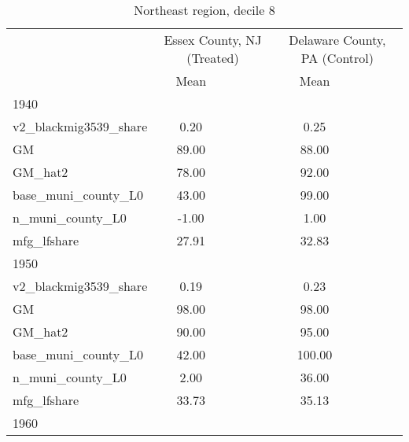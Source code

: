 \begin{table}[htbp]\centering
\def\sym#1{\ifmmode^{#1}\else\(^{#1}\)\fi}
\caption{Northeast region, decile 8 \label{tab1}}
\begin{tabular}{l*{2}{ccc}}
\toprule
                    &\multicolumn{3}{c}{Essex County, NJ (Treated)}&\multicolumn{3}{c}{Delaware County, PA (Control)}\\
                    &        Mean&            &            &        Mean&            &            \\
\midrule
1940                &            &            &            &            &            &            \\
v2\_blackmig3539\_share&        0.20&            &            &        0.25&            &            \\
GM                  &       89.00&            &            &       88.00&            &            \\
GM\_hat2             &       78.00&            &            &       92.00&            &            \\
base\_muni\_county\_L0 &       43.00&            &            &       99.00&            &            \\
n\_muni\_county\_L0    &       -1.00&            &            &        1.00&            &            \\
mfg\_lfshare         &       27.91&            &            &       32.83&            &            \\
\midrule
1950                &            &            &            &            &            &            \\
v2\_blackmig3539\_share&        0.19&            &            &        0.23&            &            \\
GM                  &       98.00&            &            &       98.00&            &            \\
GM\_hat2             &       90.00&            &            &       95.00&            &            \\
base\_muni\_county\_L0 &       42.00&            &            &      100.00&            &            \\
n\_muni\_county\_L0    &        2.00&            &            &       36.00&            &            \\
mfg\_lfshare         &       33.73&            &            &       35.13&            &            \\
\midrule
1960                &            &            &            &            &            &            \\

\end{tabular}
\end{table}
